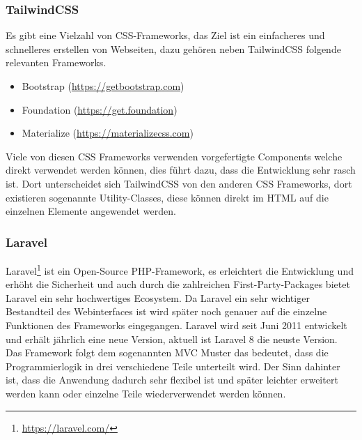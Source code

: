 \subsubsection{TailwindCSS}
Es gibt eine Vielzahl von CSS-Frameworks, das Ziel ist ein einfacheres und
schnelleres erstellen von Webseiten, dazu gehören neben TailwindCSS folgende
relevanten Frameworks.

\begin{itemize}
  \item Bootstrap (\url{https://getbootstrap.com})
  \item Foundation (\url{https://get.foundation})
  \item Materialize (\url{https://materializecss.com})
\end{itemize}

Viele von diesen CSS Frameworks verwenden vorgefertigte Components welche direkt
verwendet werden können, dies führt dazu, dass die Entwicklung sehr rasch ist.
Dort unterscheidet sich TailwindCSS von den anderen CSS Frameworks, dort
existieren sogenannte Utility-Classes, diese können direkt im \acs*{HTML} auf
die einzelnen Elemente angewendet werden.


\subsubsection{Laravel}
Laravel\footnote{\url{https://laravel.com/}} ist ein Open-Source PHP-Framework,
es erleichtert die Entwicklung und erhöht die Sicherheit und auch durch die
zahlreichen First-Party-Packages bietet Laravel ein sehr hochwertiges Ecosystem.
Da Laravel ein sehr wichtiger Bestandteil des Webinterfaces ist wird später noch
genauer auf die einzelne Funktionen des Frameworks eingegangen. Laravel wird
seit Juni 2011 entwickelt und erhält jährlich eine neue Version, aktuell ist
Laravel 8 die neuste Version.\\

Das Framework folgt dem sogenannten \ac*{MVC} Muster das bedeutet, dass die
Programmierlogik in drei verschiedene Teile unterteilt wird. Der Sinn dahinter
ist, dass die Anwendung dadurch sehr flexibel ist und später leichter erweitert
werden kann oder einzelne Teile wiederverwendet werden können.

